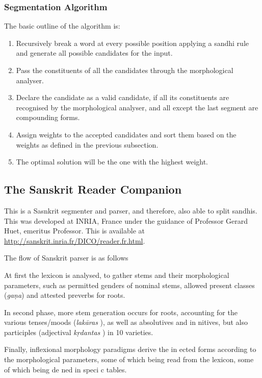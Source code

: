 \documentclass[11pt]{article}
\begin{document}
\subsubsection{Segmentation Algorithm}
The basic outline of the algorithm is\cite{Kumar2010}:
\begin{enumerate}
	\item Recursively break a word at every possible position applying a sandhi rule and generate all possible candidates for the input.
	\item Pass the constituents of all the candidates through the morphological analyser.
	\item Declare the candidate as a valid candidate, if all its constituents are recognised by the morphological analyser, and all except the last segment are compounding forms.
	\item Assign weights to the accepted candidates and sort them based on the weights as defined in the previous subsection.
	\item The optimal solution will be the one with the highest weight.
\end{enumerate}


\subsection{The Sanskrit Reader Companion } This is a Sasnkrit segmenter and parser, and therefore, also able to split sandhis. This was developed at INRIA, France under the guidance of Professor Gerard Huet, emeritus Professor. This is available at \url{http://sanskrit.inria.fr/DICO/reader.fr.html}.

 The flow of Sanskrit parser is as follows

At first the lexicon is analysed, to gather stems and their morphological parameters, such as permitted genders of nominal stems, allowed present classes (\textit{ga\d{n}a}) and attested preverbs for roots. 

In second phase, more stem generation occurs for roots, accounting  for the various tenses/moods (\textit{lak\={a}ras} ), as well as absolutives and in nitives, but also participles (adjectival \textit{k\d{r}dantas} ) in 10 varieties. 

Finally, inflexional  morphology  paradigms  derive  the  in ected  forms  according  to  the morphological parameters, some of which being read from the lexicon, some of which being de ned in speci c tables. 
\end{document}
